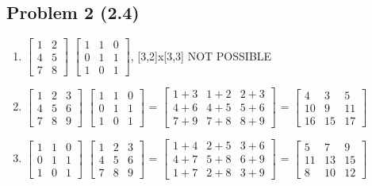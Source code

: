 \documentclass{article}
\begin{document}
\subsection*{Problem 2 (2.4)}
	\begin{enumerate}[label=(\alph*)]
		\item $\begin{bmatrix} 1 & 2 \\ 4 & 5 \\	7 & 8 \end{bmatrix}$ $\begin{bmatrix} 1 & 1 & 0 \\ 0 & 1 & 1 \\ 1 & 0 & 1 \end{bmatrix}$, [3,2]x[3,3] NOT POSSIBLE
		\item $\begin{bmatrix} 1 & 2 & 3 \\ 4 & 5 & 6 \\ 7 & 8 & 9 \end{bmatrix}$ $\begin{bmatrix} 1 & 1 & 0 \\ 0 & 1 & 1 \\ 1 & 0 & 1 \end{bmatrix}$ 
					= $\begin{bmatrix} 1 + 3 & 1 + 2 & 2 + 3 \\ 4 + 6 &  4 + 5 & 5 + 6 \\ 7 + 9 & 7 + 8 & 8 + 9 \end{bmatrix}$
					= $\begin{bmatrix} 4 & 3 & 5 \\ 10 & 9 & 11 \\ 16 & 15 & 17 \end{bmatrix}$
		\item $\begin{bmatrix} 1 & 1 & 0 \\ 0 & 1 & 1 \\ 1 & 0 & 1 \end{bmatrix}$ $\begin{bmatrix} 1 & 2 & 3 \\ 4 & 5 & 6 \\ 7 & 8 & 9 \end{bmatrix}$
					= $\begin{bmatrix} 1 + 4 & 2 + 5 & 3 + 6 \\ 4 + 7 & 5 + 8 & 6 + 9 \\ 1 + 7 & 2 + 8 & 3 + 9 \end{bmatrix}$ 
					= $\begin{bmatrix} 5 & 7 & 9 \\ 11 & 13 & 15 \\ 8 & 10 & 12 \end{bmatrix}$

\end{enumerate}
\end{document}
